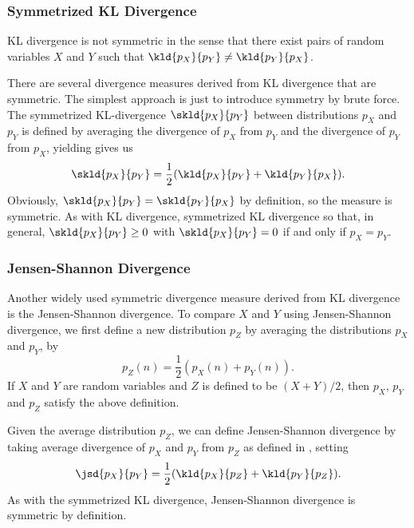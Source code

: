 \subsubsection{Symmetrized KL Divergence}\label{section:stats-symmetrized-kl-divergence}

KL divergence is not symmetric in the sense that there exist pairs of
random variables $X$ and $Y$ such that $\kld{p_X}{p_Y} \neq \kld{p_Y}{p_X}$.

There are several divergence measures derived from KL divergence that
are symmetric.  The simplest approach is just to introduce symmetry by
brute force.  The symmetrized KL-divergence $\skld{p_X}{p_Y}$ between
distributions $p_X$ and $p_Y$ is defined by averaging the divergence
of $p_X$ from $p_Y$ and the divergence of $p_Y$ from $p_X$, yielding
gives us
%
\begin{equation}
\skld{p_X}{p_Y} = \frac{1}{2}(\kld{p_X}{p_Y} + \kld{p_Y}{p_X}).
\end{equation}
%
Obviously, $\skld{p_X}{p_Y} = \skld{p_Y}{p_X}$ by definition, so the
measure is symmetric.  As with KL divergence, symmetrized KL
divergence so that, in general, $\skld{p_X}{p_Y} \geq 0$ with
$\skld{p_X}{p_Y} = 0$ if and only if $p_X = p_Y$.

\subsubsection{Jensen-Shannon Divergence}

Another widely used symmetric divergence measure derived from KL divergence
is the Jensen-Shannon divergence.  To compare $X$ and $Y$ using Jensen-Shannon
divergence, we first define a new distribution $p_{Z}$ by averaging
the distributions $p_X$ and $p_Y$, by
%
\begin{equation}\label{eq:jensen-shannon-averge-distro}
p_Z(n) = \frac{1}{2}(p_X(n) + p_Y(n)).
\end{equation}
%
If $X$ and $Y$ are random variables and $Z$ is defined to be
$(X+Y)/2$, then $p_X$, $p_Y$ and $p_Z$ satisfy the above definition.

Given the average distribution $p_Z$, we can define Jensen-Shannon
divergence by taking average divergence of $p_X$ and $p_Y$ from $p_Z$
as defined in , setting
%
\begin{equation}
\jsd{p_X}{p_Y} = \frac{1}{2}(\kld{p_X}{p_Z} + \kld{p_Y}{p_Z}).
\end{equation}
%
As with the symmetrized KL divergence, Jensen-Shannon divergence is
symmetric by definition.


